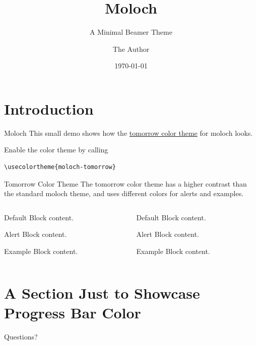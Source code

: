 \documentclass[10pt]{beamer}
\title{Moloch}
\subtitle{A Minimal Beamer Theme}
\date{\today}
\author{The Author}
\institute{Some Institution, Some University}
\begin{document}
\maketitle

\section{Introduction}

\begin{frame}[fragile]{Moloch}
  This small demo shows how the
  \href{https://github.com/chriskempson/tomorrow-theme}{tomorrow color theme}
  for moloch looks.\bigskip

  Enable the color theme by calling
  \begin{verbatim}
\usecolortheme{moloch-tomorrow}\end{verbatim}
\end{frame}

\begin{frame}[fragile]{Tomorrow Color Theme}
  The tomorrow color theme has a higher contrast than the standard moloch theme, and uses
  different colors for alerts and examples.

  \begin{columns}[T]
    \begin{column}{0.45\textwidth}
      \begin{block}{Default}
        Block content.
      \end{block}

      \begin{alertblock}{Alert}
        Block content.
      \end{alertblock}

      \begin{exampleblock}{Example}
        Block content.
      \end{exampleblock}
    \end{column}
    \begin{column}{0.45\textwidth}
      {

        \begin{block}{Default}
          Block content.
        \end{block}

        \begin{alertblock}{Alert}
          Block content.
        \end{alertblock}

        \begin{exampleblock}{Example}
          Block content.
        \end{exampleblock}
      }
    \end{column}
  \end{columns}
\end{frame}

\section{A Section Just to Showcase Progress Bar Color}

\begin{frame}[standout]
  Questions?
\end{frame}
\end{document}
